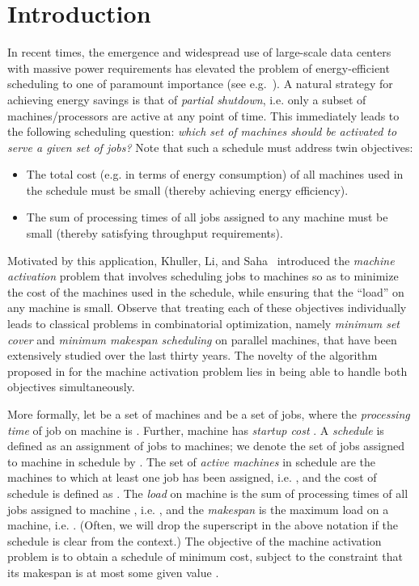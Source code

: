 \documentclass[11pt]{article}
\begin{document}
\clearpage

\setcounter{page}{1}

\section{Introduction}

In recent times, the emergence and widespread use of large-scale data centers with 
massive power requirements has elevated the problem of energy-efficient scheduling 
to one of paramount importance (see e.g.~\cite{BirmanCR09}). A natural strategy 
for achieving energy savings is that of {\em partial shutdown}, i.e. only 
a subset of machines/processors are active at any point of time. This immediately leads to 
the following scheduling question: {\em which set of machines should be activated 
to serve a given set of jobs?} Note that such a schedule must address twin
objectives:
\begin{itemize}
	\item The total cost (e.g. in terms of energy consumption) of all 
	machines used in the schedule must be small (thereby achieving energy
	efficiency).
	\item The sum of processing times of all jobs assigned to any machine
	must be small (thereby satisfying throughput requirements).
\end{itemize}
Motivated by this application, Khuller, Li, and Saha~\cite{KhullerLS10} 
introduced the {\em machine activation} problem that involves scheduling jobs 
to machines so as to minimize the cost of the machines used in the schedule, while
ensuring that the ``load'' on any machine is small.
Observe that treating each of these objectives individually leads to classical
problems in combinatorial optimization, namely {\em minimum set cover} and
{\em minimum makespan scheduling} on parallel machines, 
that have been extensively studied over
the last thirty years. The novelty of the algorithm proposed in 
\cite{KhullerLS10} for the machine activation problem lies in being able to
handle both objectives simultaneously. 

More formally, let  be a set of  machines and  be a set of  jobs, 
where the {\em processing time} of job  on machine  is .
Further, machine  has {\em startup cost} . A {\em schedule}
is defined as an assignment  of jobs to machines; we denote
the set of jobs assigned to machine  in schedule  by . 
The set of {\em active machines}  in schedule  are the machines 
to which at least one job has been assigned, i.e. 
, and the cost of schedule  
is defined as . The {\em load}  on machine 
is the sum of processing times of all jobs assigned to machine , 
i.e. , and the {\em makespan}
 is the maximum load on a machine, i.e.
. (Often, we will drop the 
superscript  in the above notation if the schedule is clear from the context.) 
The objective of the machine activation problem is to obtain a schedule of minimum 
cost, subject to the constraint that its makespan is at most some given value .
\end{document}
